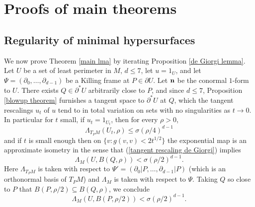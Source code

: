 \section{Proofs of main theorems}\label{proof of main thm}
\subsection{Regularity of minimal hypersurfaces}
We now prove Theorem \ref{main lma} by iterating Proposition \ref{de Giorgi lemma}.
Let $U$ be a set of least perimeter in $M$, $d \leq 7$, let $u = 1_U$, and let $\Psi = (\partial_0, \dots, \partial_{d - 1})$ be a Killing frame at $P \in \partial U$.
Let $\mathbf n$ be the conormal $1$-form to $U$.
There exists $Q \in \partial^* U$ arbitrarily close to $P$, and since $d \leq 7$, Proposition \ref{blowup theorem} furnishes a tangent space to $\partial^* U$ at $Q$, which the tangent rescalings $u_t$ of $u$ tend to in total variation on sets with no singularities as $t \to 0$.
In particular for $t$ small, if $u_t = 1_{U_t}$, then for every $\rho > 0$,
\begin{equation}\label{tangent rescaling de Giorgi}
    \Lambda_{T_PM}(U_t, \rho) \leq \sigma (\rho/4)^{d - 1}
\end{equation}
and if $t$ is small enough then on $\{v: g(v, v) < 2t^{1/2}\}$ the exponential map is an approximate isometry in the sense that (\ref{tangent rescaling de Giorgi}) implies 
$$\Lambda_M (U, B(Q, \rho)) < \sigma (\rho/2)^{d - 1}.$$
Here $\Lambda_{T_PM}$ is taken with respect to $\Psi' = (\partial_0|P, \dots, \partial_{d - 1}|P)$ (which is an orthonormal basis of $T_PM$) and $\Lambda_M$ is taken with respect to $\Psi$.
Taking $Q$ so close to $P$ that $B(P, \rho/2) \subseteq B(Q, \rho)$, we conclude
\begin{equation}\label{base case de Giorgi}
    \Lambda_M (U, B(P, \rho/2)) < \sigma (\rho/2)^{d - 1}.
\end{equation}

